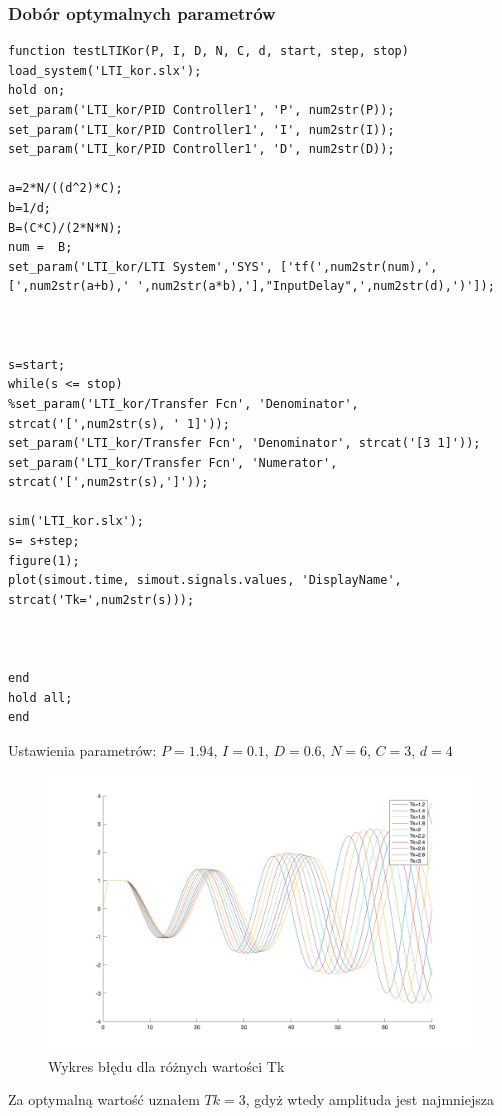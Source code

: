 \documentclass[a4paper,10pt]{article}
\begin{document}
\subsubsection{Dobór optymalnych parametrów}
\begin{lstlisting}[caption=Funckja do symulacji systemu z blokiem korekcyjnym]
function testLTIKor(P, I, D, N, C, d, start, step, stop)
load_system('LTI_kor.slx');
hold on;
set_param('LTI_kor/PID Controller1', 'P', num2str(P));   
set_param('LTI_kor/PID Controller1', 'I', num2str(I));   
set_param('LTI_kor/PID Controller1', 'D', num2str(D));

a=2*N/((d^2)*C);
b=1/d;
B=(C*C)/(2*N*N); 
num =  B;
set_param('LTI_kor/LTI System','SYS', ['tf(',num2str(num),',[',num2str(a+b),' ',num2str(a*b),'],"InputDelay",',num2str(d),')']);



s=start;
while(s <= stop)
%set_param('LTI_kor/Transfer Fcn', 'Denominator', strcat('[',num2str(s), ' 1]'));
set_param('LTI_kor/Transfer Fcn', 'Denominator', strcat('[3 1]'));
set_param('LTI_kor/Transfer Fcn', 'Numerator', strcat('[',num2str(s),']'));

sim('LTI_kor.slx');
s= s+step;
figure(1);
plot(simout.time, simout.signals.values, 'DisplayName', strcat('Tk=',num2str(s)));



end
hold all;
end
\end{lstlisting}

Ustawienia parametrów: $P=1.94$, $I=0.1$, $D=0.6$, $N=6$, $C=3$, $d=4$

\begin{figure}[!h]
	\centering
	\includegraphics[width=120mm]{do_tk.png}
	\caption{Wykres błędu dla różnych wartości Tk}
	\label{fig:Wykres 8}
\end{figure}
Za optymalną wartość uznałem $Tk=3$, gdyż wtedy amplituda jest najmniejsza
\end{document}
